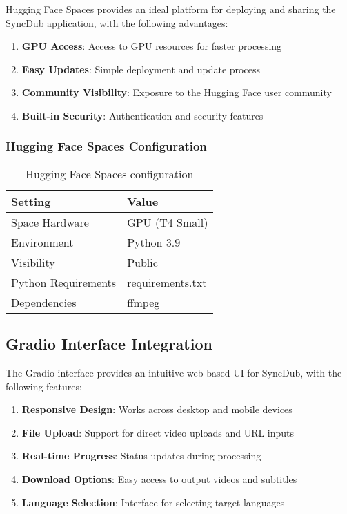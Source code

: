 \documentclass[11pt,a4paper]{article}
\begin{document}
Hugging Face Spaces provides an ideal platform for deploying and sharing the SyncDub application, with the following advantages:

\begin{enumerate}
    \item \textbf{GPU Access}: Access to GPU resources for faster processing
    \item \textbf{Easy Updates}: Simple deployment and update process
    \item \textbf{Community Visibility}: Exposure to the Hugging Face user community
    \item \textbf{Built-in Security}: Authentication and security features
\end{enumerate}

\subsubsection{Hugging Face Spaces Configuration}

\begin{table}[h]
\centering
\begin{tabular}{ll}
\toprule
\textbf{Setting} & \textbf{Value} \\
\midrule
Space Hardware & GPU (T4 Small) \\
Environment & Python 3.9 \\
Visibility & Public \\
Python Requirements & requirements.txt \\
Dependencies & ffmpeg \\
\bottomrule
\end{tabular}
\caption{Hugging Face Spaces configuration}
\end{table}

\subsection{Gradio Interface Integration}

The Gradio interface provides an intuitive web-based UI for SyncDub, with the following features:

\begin{enumerate}
    \item \textbf{Responsive Design}: Works across desktop and mobile devices
    \item \textbf{File Upload}: Support for direct video uploads and URL inputs
    \item \textbf{Real-time Progress}: Status updates during processing
    \item \textbf{Download Options}: Easy access to output videos and subtitles
    \item \textbf{Language Selection}: Interface for selecting target languages
\end{enumerate}
\end{document}
